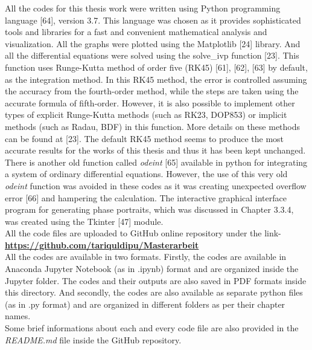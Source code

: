 All the codes for this thesis work were written using Python programming language [64], version 3.7. This language was chosen as it provides sophisticated tools and libraries for a fast and convenient mathematical analysis and visualization. All the graphs were plotted using the Matplotlib [24] library. And all the differential equations were solved using the solve\_ivp function [23]. This function uses Runge-Kutta method of order five (RK45) [61], [62], [63] by default, as the integration method. In this RK45 method, the error is controlled assuming the accuracy from the fourth-order method, while the steps are taken using the accurate formula of fifth-order. However, it is also possible to implement other types of explicit Runge-Kutta methods (such as RK23, DOP853) or implicit methods (such as Radau, BDF) in this function. More details on these methods can be found at [23]. The default RK45 method seems to produce the most accurate results for the works of this thesis and thus it has been kept unchanged. There is another old function called \textit{odeint} [65] available in python for integrating a system of ordinary differential equations. However, the use of this very old \textit{odeint} function was avoided in these codes as it was creating unexpected overflow error [66] and hampering the calculation. The interactive graphical interface program for generating phase portraits, which was discussed in Chapter 3.3.4, was created using the Tkinter [47] module. \\

All the code files are uploaded to GitHub online repository under the link- \textbf{\url{https://github.com/tariquldipu/Masterarbeit}} \\

All the codes are available in two formats. Firstly, the codes are available in Anaconda Jupyter Notebook (as in .ipynb) format and are organized inside the Jupyter folder. The codes and their outputs are also saved in PDF formats inside this directory.
And secondly, the codes are also available as separate python files (as in .py format) and are organized in different folders as per their chapter names. \\ 

Some brief informations about each and every code file are also provided in the \textit{README.md} file inside the GitHub repository.
